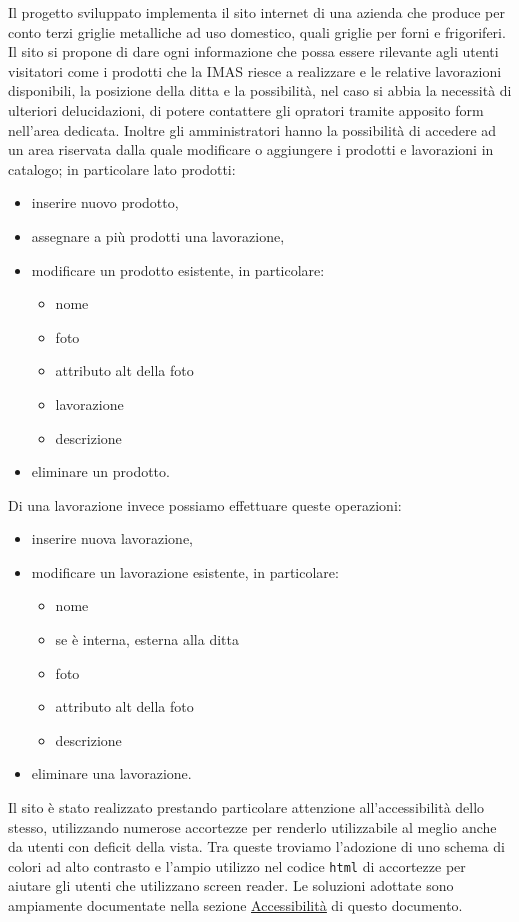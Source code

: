 \documentclass[11pt]{article}
\begin{document}
Il progetto sviluppato implementa il sito internet di una azienda che produce per conto terzi griglie metalliche ad uso domestico, quali griglie per forni e frigoriferi.
Il sito si propone di dare ogni informazione che possa essere rilevante agli utenti visitatori come i prodotti che la IMAS riesce a realizzare e le relative lavorazioni disponibili, la posizione della ditta  e la possibilità, nel caso si abbia la necessità di ulteriori delucidazioni, di potere contattere gli opratori tramite apposito form nell'area dedicata.
Inoltre gli amministratori hanno la possibilità di accedere ad un area riservata dalla quale modificare  o aggiungere i prodotti e lavorazioni in catalogo; in particolare lato prodotti:
\begin{itemize}
	\item inserire nuovo prodotto,
	\item assegnare a più prodotti una lavorazione, 
	\item modificare un prodotto esistente, in particolare:	
	\begin{itemize}
		\item nome
		\item foto
		\item attributo alt della foto
		\item lavorazione
		\item descrizione
	\end{itemize}
	\item eliminare un prodotto.
\end{itemize}
Di una lavorazione invece possiamo effettuare queste operazioni:
\begin{itemize}
	\item inserire nuova lavorazione,
	\item modificare un lavorazione esistente, in particolare:	
	\begin{itemize}
		\item nome
		\item se è interna, esterna alla ditta
		\item foto
		\item attributo alt della foto
		\item descrizione
	\end{itemize}
	\item eliminare una lavorazione.
\end{itemize}
Il sito è stato realizzato prestando particolare attenzione all'accessibilità dello stesso, utilizzando numerose accortezze per renderlo utilizzabile al meglio anche da utenti con deficit della vista. Tra queste troviamo l'adozione di uno schema di colori ad alto contrasto e l'ampio utilizzo nel codice \texttt{html} di accortezze per aiutare gli utenti che utilizzano screen reader. Le soluzioni adottate sono ampiamente documentate nella sezione \hyperref[sec:Accessibilita]{\underline{Accessibilità}} di questo documento.
\end{document}
